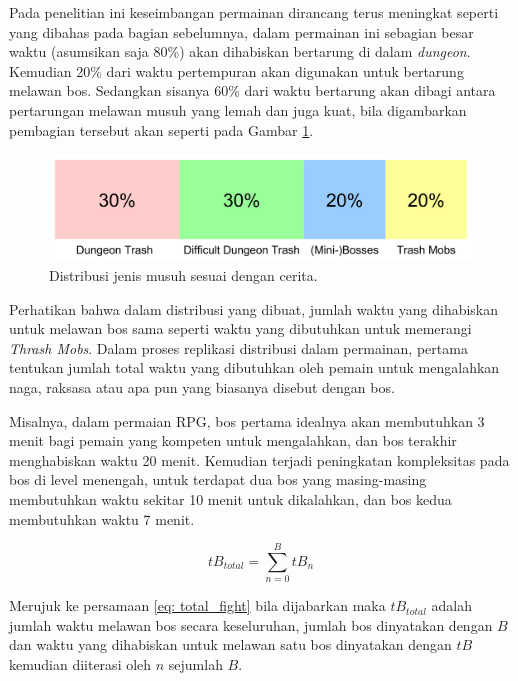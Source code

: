\begin{subs}
\begin{enumerate}[label=\textbf{\arabic*).}]
		Pada penelitian ini keseimbangan permainan dirancang terus meningkat seperti yang dibahas pada bagian sebelumnya, dalam permainan ini sebagian besar waktu (asumsikan saja 80\%) akan dihabiskan bertarung di dalam \textit{dungeon}. Kemudian 20\% dari waktu pertempuran akan digunakan untuk bertarung melawan bos. Sedangkan sisanya 60\% dari waktu bertarung akan dibagi antara pertarungan melawan musuh yang lemah dan juga kuat, bila digambarkan pembagian tersebut akan seperti pada Gambar \ref{fig:enemy_difficulty_percentage}.
		\vspace{1ex}
		
		\begin{figure} [!h] \centering
			\includegraphics[scale=0.15]{img/enemy_type_distribution.png}
			\caption{Distribusi jenis musuh sesuai dengan cerita.}
			\label{fig:enemy_difficulty_percentage}
		\end{figure}
		
		Perhatikan bahwa dalam distribusi yang dibuat, jumlah waktu yang dihabiskan untuk melawan bos sama seperti waktu yang dibutuhkan untuk memerangi \textit{Thrash Mobs}. Dalam proses replikasi distribusi dalam permainan, pertama tentukan jumlah total waktu yang dibutuhkan oleh pemain untuk mengalahkan naga, raksasa atau apa pun yang biasanya disebut dengan bos.
		\vspace{1ex}
		
		Misalnya, dalam permaian RPG, bos pertama idealnya akan membutuhkan 3 menit bagi pemain yang kompeten untuk mengalahkan, dan bos terakhir menghabiskan waktu 20 menit. Kemudian terjadi peningkatan kompleksitas pada bos di level menengah, untuk terdapat dua bos yang masing-masing membutuhkan waktu sekitar 10 menit untuk dikalahkan, dan bos kedua membutuhkan waktu 7 menit.
		
		\begin{equation}
		\label{eq: total_fight}
		tB_{total} = \sum_{n = 0}^{B} tB_{n}
		\end{equation}
		
		Merujuk ke persamaan \ref{eq: total_fight} bila dijabarkan maka $tB_{total}$ adalah jumlah waktu melawan bos secara keseluruhan, jumlah bos dinyatakan dengan $B$ dan waktu yang dihabiskan untuk melawan satu bos dinyatakan dengan $tB$ kemudian diiterasi oleh $n$ sejumlah $B$.
		\vspace{1ex}
		

\end{enumerate}
\end{subs}

